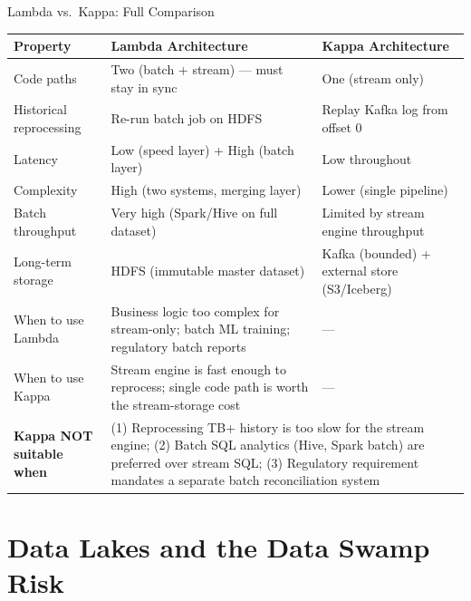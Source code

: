 \documentclass[aspectratio=169,10pt]{beamer}
\begin{document}
\begin{frame}{Lambda vs.\ Kappa: Full Comparison}
  \centering
  \renewcommand{\arraystretch}{1.5}
  \begin{tabular}{p{3.2cm}p{4.5cm}p{4.5cm}}
    \toprule
    \textbf{Property} & \textbf{Lambda Architecture} & \textbf{Kappa Architecture} \\
    \midrule
    Code paths & Two (batch + stream) — must stay in sync & One (stream only) \\
    Historical reprocessing & Re-run batch job on HDFS & Replay Kafka log from offset 0 \\
    Latency & Low (speed layer) + High (batch layer) & Low throughout \\
    Complexity & High (two systems, merging layer) & Lower (single pipeline) \\
    Batch throughput & Very high (Spark/Hive on full dataset) & Limited by stream engine throughput \\
    Long-term storage & HDFS (immutable master dataset) & Kafka (bounded) + external store (S3/Iceberg) \\
    When to use Lambda & Business logic too complex for stream-only; batch ML training; regulatory batch reports & — \\
    When to use Kappa & Stream engine is fast enough to reprocess; single code path is worth the stream-storage cost & — \\
    \midrule
    \textbf{Kappa NOT suitable when} & \multicolumn{2}{p{9.0cm}}{\small (1) Reprocessing TB+ history is too slow for the stream engine; (2) Batch SQL analytics (Hive, Spark batch) are preferred over stream SQL; (3) Regulatory requirement mandates a separate batch reconciliation system} \\
    \bottomrule
  \end{tabular}
\end{frame}

\section{Data Lakes and the Data Swamp Risk}
\end{document}
